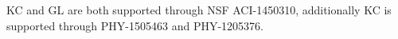 \documentclass[twocolumn,superscriptaddress,aps]{revtex4-1}
\theoremstyle{plain}
\begin{document}

\begin{acknowledgments}
    KC and GL are both supported through NSF ACI-1450310, additionally KC is supported
    through PHY-1505463 and PHY-1205376.
\end{acknowledgments}





\end{document}
